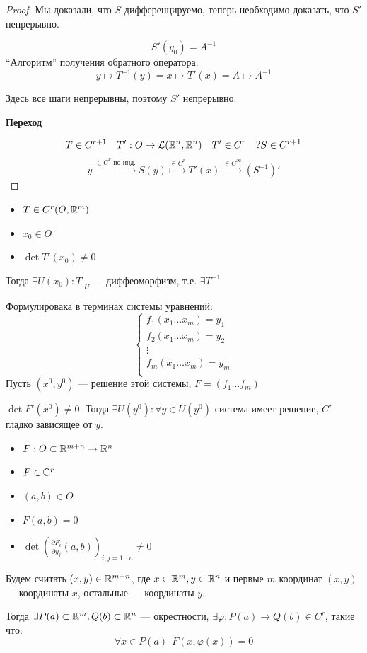 \begin{proof}
    Мы доказали, что $S$ дифференцируемо, теперь необходимо доказать, что $S'$ непрерывно.

    $$S'(y_0) = A^{-1}$$
    ``Алгоритм'' получения обратного оператора:
    $$y \mapsto T^{-1}(y) = x\mapsto T'(x) = A \mapsto A^{-1}$$

    Здесь все шаги непрерывны, поэтому $S'$ непрерывно.

    \textbf{Переход}

    $$T \in C^{r+1} \quad T' : O\to\mathcal L(\mathbb{R}^n, \mathbb{R}^n) \quad T'\in C^{r} \quad ? S\in C^{r+1}$$
    $$y \stackrel{\in C^r \text{ по инд.}}{\mapsto} S(y) \stackrel{\in C^r}{\mapsto} T'(x) \stackrel{\in C^\infty}{\mapsto} (S^{-1})'$$
\end{proof}

\begin{theorem}\itemfix
    \begin{itemize}
        \item $T\in C^r(O, \mathbb{R}^m)$
        \item $x_0\in O$
        \item $\det T'(x_0)\not=0$
    \end{itemize}
    Тогда $\exists U(x_0) : T\Big|_{U}$ --- диффеоморфизм, т.е. $\exists T^{-1}$

    Формулировака в терминах системы уравнений:
    $$\begin{cases}
            f_1(x_1\ldots x_m) = y_1 \\
            f_2(x_1\ldots x_m) = y_2 \\
            \vdots                   \\
            f_m(x_1\ldots x_m) = y_m \\
        \end{cases}$$
    Пусть $(x^0, y^0)$ --- решение этой системы, $F = (f_1\ldots f_m)$

    $\det F'(x^0) \not=0$. Тогда $\exists U(y^0) : \forall y\in U(y^0)$ система имеет решение, $C^r$ гладко зависящее от $y$.
\end{theorem}

\begin{theorem}\itemfix
    \begin{itemize}
        \item $F : O\subset\mathbb{R}^{m+n} \to\mathbb{R}^n$
        \item $F\in\mathbb{C}^r$
        \item $(a, b)\in O$
        \item $F(a, b) = 0$
        \item $\det \left(\frac{\partial F_i}{\partial y_j}(a, b)\right)_{i, j = 1\ldots n} \not=0$
    \end{itemize}

    Будем считать $(x, y)\in\mathbb{R}^{m+n}$, где $x\in\mathbb{R}^m, y\in\mathbb{R}^n$ и первые $m$ координат $(x, y)$ --- координаты $x$, остальные --- координаты $y$.

    Тогда $\exists P(a)\subset\mathbb{R}^m, Q(b)\subset\mathbb{R}^n$ --- окрестности, $\exists \varphi : P(a) \to Q(b) \in C^r$, такие что:
    $$\forall x\in P(a) \ \ F(x, \varphi(x)) = 0$$
\end{theorem}

